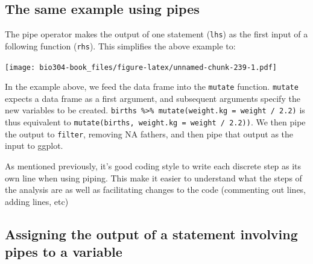\documentclass[]{book}
\newenvironment{Shaded}{\begin{snugshade}}{\end{snugshade}}
\newcommand{\DataTypeTok}[1]{\textcolor[rgb]{0.13,0.29,0.53}{#1}}
\newcommand{\FloatTok}[1]{\textcolor[rgb]{0.00,0.00,0.81}{#1}}
\newcommand{\KeywordTok}[1]{\textcolor[rgb]{0.13,0.29,0.53}{\textbf{#1}}}
\newcommand{\NormalTok}[1]{#1}
\newcommand{\OperatorTok}[1]{\textcolor[rgb]{0.81,0.36,0.00}{\textbf{#1}}}
\newcommand{\StringTok}[1]{\textcolor[rgb]{0.31,0.60,0.02}{#1}}
\theoremstyle{definition}
\theoremstyle{definition}
\theoremstyle{definition}
\theoremstyle{remark}
\begin{document}
\hypertarget{the-same-example-using-pipes}{%
\subsection{The same example using
pipes}\label{the-same-example-using-pipes}}

The pipe operator makes the output of one statement (\texttt{lhs}) as
the first input of a following function (\texttt{rhs}). This simplifies
the above example to:

\begin{Shaded}
\end{Shaded}

\texttt{[image: bio304-book\_files/figure-latex/unnamed-chunk-239-1.pdf]}

In the example above, we feed the data frame into the \texttt{mutate}
function. \texttt{mutate} expects a data frame as a first argument, and
subsequent arguments specify the new variables to be created.
\texttt{births\ \%\textgreater{}\%\ mutate(weight.kg\ =\ weight\ /\ 2.2)}
is thus equivalent to
\texttt{mutate(births,\ weight.kg\ =\ weight\ /\ 2.2))}. We then pipe
the output to \texttt{filter}, removing NA fathers, and then pipe that
output as the input to ggplot.

As mentioned previously, it's good coding style to write each discrete
step as its own line when using piping. This make it easier to
understand what the steps of the analysis are as well as facilitating
changes to the code (commenting out lines, adding lines, etc)

\hypertarget{assigning-the-output-of-a-statement-involving-pipes-to-a-variable}{%
\subsection{Assigning the output of a statement involving pipes to a
variable}\label{assigning-the-output-of-a-statement-involving-pipes-to-a-variable}}
\end{document}

